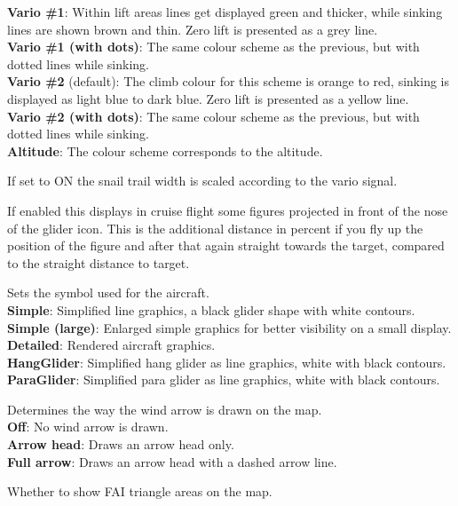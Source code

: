 \begin{description}
  {\bf Vario \#1}: Within lift areas lines get displayed green and
  thicker, while sinking lines are shown brown and thin.  Zero lift
  is presented as a grey line. \\
  {\bf Vario \#1 (with dots)}: The same colour scheme as the previous, but with dotted 
  lines while sinking. \\
  {\bf Vario \#2} (default): The climb colour for this scheme is orange to red,
  sinking is displayed as light blue to dark blue. Zero lift is presented as a
  yellow line. \\
  {\bf Vario \#2 (with dots)}: The same colour scheme as the previous, but with dotted 
  lines while sinking. \\
  {\bf Altitude}: The colour scheme corresponds to the altitude.
\item[Trail scaled*] \label{conf:trailscaled} If set to ON the snail trail 
  width is scaled according to the vario signal.
\item[Detour cost markers*]  If enabled this displays in cruise flight some
  figures projected in front of the nose of the glider icon.  This is the
  additional distance in percent if you fly up the position of the figure and
  after that again straight towards the target, compared to the straight distance
  to target.
\item[Aircraft symbol*]  Sets the symbol used for the aircraft. \\
  {\bf Simple}: Simplified line graphics, a black glider shape with white contours. \\
  {\bf Simple (large)}: Enlarged simple graphics for better visibility on a small display. \\
  {\bf Detailed}: Rendered aircraft graphics. \\
  {\bf HangGlider}: Simplified hang glider as line graphics, white with black contours. \\
  {\bf ParaGlider}: Simplified para glider as line graphics, white with black contours.
\item[Wind arrow*]  Determines the way the wind arrow is drawn on the map. \\
  {\bf Off}: No wind arrow is drawn. \\
  {\bf Arrow head}: Draws an arrow head only. \\
  {\bf Full arrow}: Draws an arrow head with a dashed arrow line.
\item[FAI triangle areas] Whether to show FAI triangle areas on the map.
  
\end{description}


